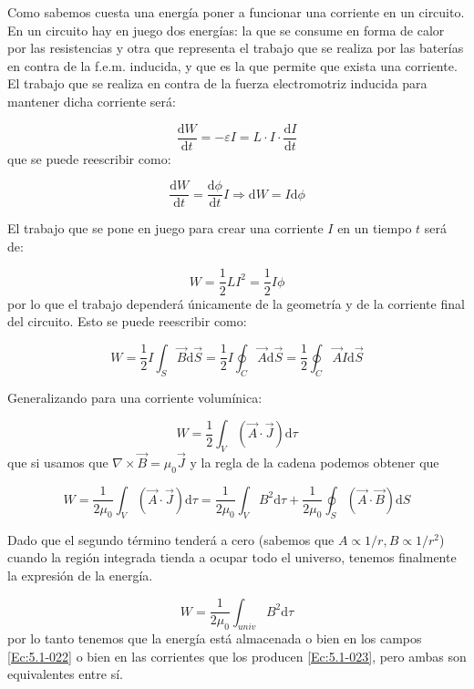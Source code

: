 \documentclass[12pt,a4paper]{article}
\newcommand{\D}{\mathrm{d}}
\begin{document}
Como sabemos cuesta una energía poner a funcionar una corriente en un circuito. En un circuito hay en juego dos energías: la que se consume en forma de calor por las resistencias y otra que representa el trabajo que se realiza por las baterías en contra de la f.e.m. inducida, y que es la que permite que exista una corriente. El trabajo que se realiza en contra de la fuerza electromotriz inducida para mantener dicha corriente será:

\begin{equation}
\dfrac{\D W}{\D t} = - \varepsilon I = L \cdot I \cdot \dfrac{\D I}{\D t}
\end{equation}
que se puede reescribir como:

\begin{equation}
\dfrac{\D W}{\D t} =  \dfrac{\D \phi}{\D t} I \Longrightarrow \D W = I \D \phi
\end{equation}

El trabajo que se pone en juego para crear una corriente $I$ en un tiempo $t$ será de:

\begin{equation}
W = \dfrac{1}{2} L I^2 = \dfrac{1}{2} I \phi
\end{equation}
por lo que el trabajo dependerá únicamente de la geometría y de la corriente final del circuito. Esto se puede reescribir como:

$$ W = \dfrac{1}{2} I \int_S \vec{B} \D \vec{S} = \dfrac{1}{2} I \oint_C \vec{A} \D \vec{S}
=  \dfrac{1}{2} \oint_C \vec{A} I \D \vec{S} $$ 


Generalizando para una corriente volumínica:

\begin{equation}
W = \dfrac{1}{2} \int_V (\vec{A} \cdot \vec{J}) \D \tau \label{Ec:5.1-022}
\end{equation}
que si usamos que $\nabla \times \vec{B} = \mu_0 \vec{J}$ y la regla de la cadena podemos obtener que

$$ W = \dfrac{1}{2 \mu_0} \int_V (\vec{A} \cdot \vec{J})  \D \tau = \dfrac{1}{2 \mu_0} \int_V B^2 \D \tau + \dfrac{1}{2 \mu_0} \oint_S(\vec{A} \cdot \vec{B})   \D S $$

Dado que el segundo término tenderá a cero (sabemos que $A \propto 1/r, B \propto 1/r^2$) cuando la región integrada tienda a ocupar todo el universo, tenemos finalmente la expresión de la energía. 

\begin{equation}
W = \dfrac{1}{2 \mu_0} \int_{univ} B^2 \D \tau \label{Ec:5.1-023}
\end{equation}
por lo tanto tenemos que la energía está almacenada o bien en los campos \ref{Ec:5.1-022} o bien en las corrientes que los producen \ref{Ec:5.1-023}, pero ambas son equivalentes entre sí. \\
\end{document}

